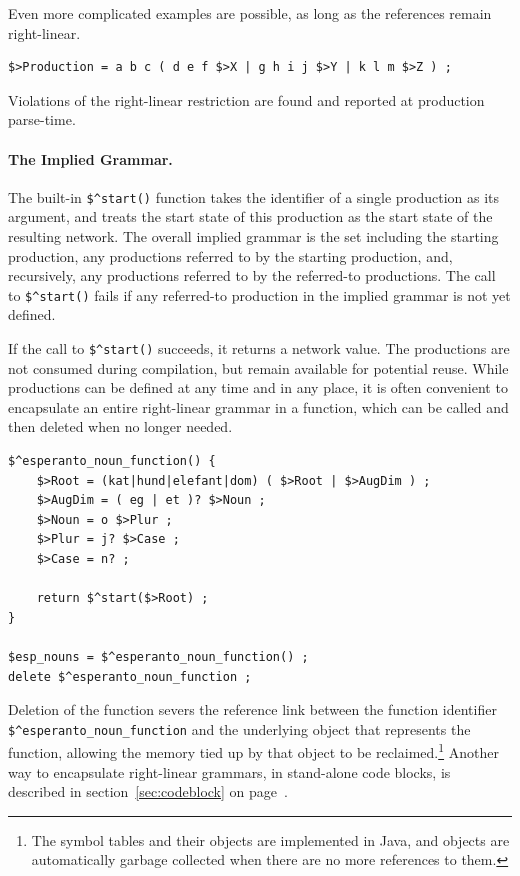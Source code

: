 \documentclass[letterpaper,12pt]{article}
\begin{document}
\noindent
Even more complicated examples are possible, as long as the references remain
right-linear. 

\begin{Verbatim}[fontsize=\small]
$>Production = a b c ( d e f $>X | g h i j $>Y | k l m $>Z ) ;
\end{Verbatim}

\noindent
Violations of the right-linear restriction are found and reported
at production parse-time.

\paragraph{The Implied Grammar.}

The built-in \verb!$^start()! function takes the identifier of a single
production as its argument, and treats the start state of this production as the
start state of the resulting network.  The overall implied grammar is the set
including the
starting production, any productions referred to by the starting
production, and, 
recursively, any productions referred to by the referred-to productions.
The call to \verb!$^start()! fails if any referred-to production in the
implied grammar is
not yet defined.

If the call to \verb!$^start()! succeeds, it returns a network value.  The
productions are not consumed during compilation, but remain available for
potential reuse.  While productions can be defined at any time and in any
place, it is often convenient to encapsulate an entire right-linear grammar
in a function, which can be called and then deleted when no longer
needed.

\begin{Verbatim}[fontsize=\small]
$^esperanto_noun_function() {
	$>Root = (kat|hund|elefant|dom) ( $>Root | $>AugDim ) ;
	$>AugDim = ( eg | et )? $>Noun ;
	$>Noun = o $>Plur ;
	$>Plur = j? $>Case ;
	$>Case = n? ;

	return $^start($>Root) ;
}

$esp_nouns = $^esperanto_noun_function() ;
delete $^esperanto_noun_function ;
\end{Verbatim}

Deletion of the function severs the reference link between the function
identifier \verb!$^esperanto_noun_function! and the underlying object that
represents the function, allowing the memory tied up by that object to be
reclaimed.\footnote{The symbol tables and their objects are implemented in
Java, and objects are automatically garbage collected when there are no
more references to them.}  Another way to encapsulate right-linear
grammars, in stand-alone code blocks, is described in
section~\ref{sec:codeblock} on page~\pageref{sec:codeblock}.
\end{document}
